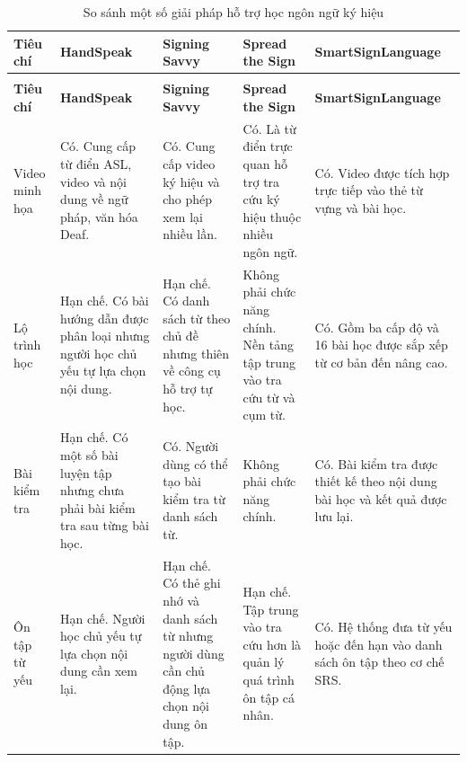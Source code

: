 \begingroup
\small
\setlength{\tabcolsep}{3pt}
\renewcommand{\arraystretch}{1.15}
\begin{longtable}{
  |>{\raggedright\arraybackslash}p{1.8cm}
  |>{\raggedright\arraybackslash}p{3.15cm}
  |>{\raggedright\arraybackslash}p{3.15cm}
  |>{\raggedright\arraybackslash}p{3.15cm}
  |>{\raggedright\arraybackslash}p{3.15cm}|}
  \caption{So sánh một số giải pháp hỗ trợ học ngôn ngữ ký hiệu}
  \label{tab:comparison}\\
  \hline
  \textbf{Tiêu chí} &
  \textbf{HandSpeak} &
  \textbf{Signing Savvy} &
  \textbf{Spread the Sign} &
  \textbf{SmartSignLanguage} \\
  \hline
  \endfirsthead

  \multicolumn{5}{c}{\tablename\ \thetable\ -- tiếp theo} \\
  \hline
  \textbf{Tiêu chí} &
  \textbf{HandSpeak} &
  \textbf{Signing Savvy} &
  \textbf{Spread the Sign} &
  \textbf{SmartSignLanguage} \\
  \hline
  \endhead

  Video minh họa &
  Có. Cung cấp từ điển ASL, video và nội dung về ngữ pháp, văn hóa Deaf. &
  Có. Cung cấp video ký hiệu và cho phép xem lại nhiều lần. &
  Có. Là từ điển trực quan hỗ trợ tra cứu ký hiệu thuộc nhiều ngôn ngữ. &
  Có. Video được tích hợp trực tiếp vào thẻ từ vựng và bài học. \\
  \hline

  Lộ trình học &
  Hạn chế. Có bài hướng dẫn được phân loại nhưng người học chủ yếu tự lựa chọn
  nội dung. &
  Hạn chế. Có danh sách từ theo chủ đề nhưng thiên về công cụ hỗ trợ tự học. &
  Không phải chức năng chính. Nền tảng tập trung vào tra cứu từ và cụm từ. &
  Có. Gồm ba cấp độ và 16 bài học được sắp xếp từ cơ bản đến nâng cao. \\
  \hline

  Bài kiểm tra &
  Hạn chế. Có một số bài luyện tập nhưng chưa phải bài kiểm tra sau từng bài
  học. &
  Có. Người dùng có thể tạo bài kiểm tra từ danh sách từ. &
  Không phải chức năng chính. &
  Có. Bài kiểm tra được thiết kế theo nội dung bài học và kết quả được lưu lại. \\
  \hline

  Ôn tập từ yếu &
  Hạn chế. Người học chủ yếu tự lựa chọn nội dung cần xem lại. &
  Hạn chế. Có thẻ ghi nhớ và danh sách từ nhưng người dùng cần chủ động lựa
  chọn nội dung ôn tập. &
  Hạn chế. Tập trung vào tra cứu hơn là quản lý quá trình ôn tập cá nhân. &
  Có. Hệ thống đưa từ yếu hoặc đến hạn vào danh sách ôn tập theo cơ chế SRS. \\
  \hline


\end{longtable}
